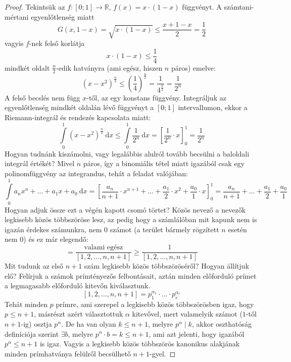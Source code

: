 \documentclass[12pt]{book}
\theoremstyle{plain} %
\theoremstyle{definition} %
\theoremstyle{remark}
\numberwithin{equation}{section}  %
\def\R{\mathbb{R}}
\begin{document}
	\begin{proof}
		Tekintsük az $f\colon [0;1] \to \R$, $f(x)=x\cdot (1-x)$ függvényt. A számtani-mértani egyenlőtlenség miatt 
		\[  G(x, 1-x) = \sqrt{x\cdot (1-x)} \leq \dfrac{x+1-x}{2} = \dfrac{1}{2} \]
		vagyis $f$-nek felső korlátja
		\[ x\cdot (1-x) \leq \dfrac{1}{4} \]
		mindkét oldalt $\frac{n}{2}$-edik hatványra (ami egész, hiszen $n$ páros) emelve:
		\[ (x-x^2)^\frac{n}{2} \leq \left (\dfrac{1}{4}\right)^\frac{n}{2} = \dfrac{1}{4^\frac{n}{2}} = \dfrac{1}{2^n}  \]
		A felső becslés nem függ $x$-től, az egy konstans függvény. Integráljuk az egyenlőtlenség mindkét oldalán lévő függvényt a $[0;1]$ intervallumon, ekkor a Riemann-integrál és rendezés kapcsolata miatt:
		\[ \int\limits_{0}^{1} (x-x^2)^{\frac{n}{2}}\ \mathrm{d}x \leq \int\limits_{0}^{1} \dfrac{1}{2^n}\ \mathrm{d}x = \left [\dfrac{1}{2^n} \cdot x\right]_{0}^{1} = \dfrac{1}{2^n} \]
		Hogyan tudnánk kiszámolni, vagy legalábbis alulról tovább becsülni a baloldali integrál értékét? Mivel $n$ páros, így a binomiális tétel miatt igazából csak egy polinomfüggvény az integrandus, tehát a feladat valójában:
		\[ \int\limits_{0}^{1} a_n x^n + \ldots + a_1 x + a_0\ \mathrm{d}x = \left[ \dfrac{a_n}{n+1} \cdot x^{n+1} + \ldots + \dfrac{a_1}{2} \cdot x^{2} + \dfrac{a_0}{1} \cdot x  \right]_{0}^{1} = \dfrac{a_n}{n+1} + \ldots + \dfrac{a_1}{2} + \dfrac{a_0}{1} \]
		Hogyan adjuk össze ezt a végén kapott csomó törtet? Közös nevező a nevezők legkisebb közös többszöröse lesz, az pedig hogy a számlálóban mit kapunk nem is igazán érdekes számunkra, nem $0$ számot (a terület bármely rögzített $n$ esetén nem $0$) és ez már elegendő:
		\[ = \dfrac{\text{valami egész}}{[1,2,\ldots, n, n+1]} \geq \dfrac{1}{{[1,2,\ldots, n, n+1]}}  \]
		Mit tudunk az első $n+1$ szám legkisebb közös többszöröséről? Hogyan állítjuk elő? Felírjuk a számok prímtényezős felbontásait, aztán minden előforduló prímet a legmagasabb előforduló kitevőn kiválasztunk.
		\[ [1, 2, \ldots, n, n+1] = p_1^{\alpha_1} \cdot \ldots \cdot p_r^{\alpha_r}  \]
		Tehát minden $p$ prímre, ami szerepel a legkisebb közös többszörösben igaz, hogy $p \leq n+1$, másrészt azért választottuk $\alpha$ kitevővel, mert valamelyik számot ($1$-től $n+1$-ig) osztja $p^{\alpha}$. De ha van olyan $k \leq n + 1$, melyre $p^{\alpha} \mid k$, akkor oszthatóság definíciója szerint $\exists b$, melyre $ p^{\alpha} \cdot b = k \leq n + 1$, ami azt jelenti, hogy igazából $p^{\alpha} \leq n+1$ is igaz. Vagyis a legkisebb közös többszörös kanonikus alakjának minden prímhatványa felülről becsülhető $n+1$-gyel.
		

\end{proof}
\end{document}
